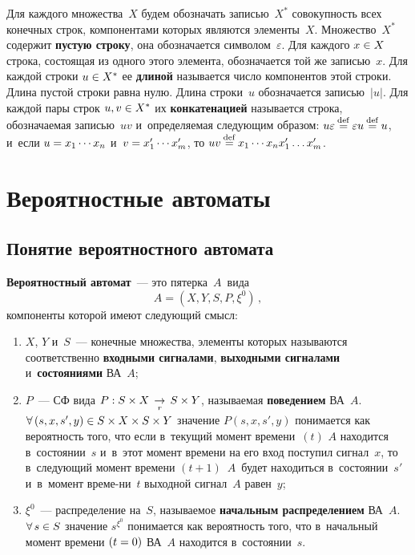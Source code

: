 \begin{multicols}{2}
Для каждого множества~$X$  будем обозначать записью~$X^*$
совокупность всех конечных строк, компонентами
которых являются элементы~$X$. Множество~$X^*$ содержит \textbf{пустую строку}, она обозначается
символом~$\varepsilon$.
Для каждого $x\hm\in X$ строка, состоящая из одного
этого элемента, обозначается той же записью~$x$.
Для каждой строки $u\hm\in X^*$
ее \textbf{длиной} называется чис\-ло компонентов этой строки. Длина пустой строки равна нулю.
Длина строки~$u$ обозначается записью~$|u|$.
Для каждой пары строк $u,v\hm\in X^*$
их \textbf{конкатенацией} называется строка, обозначаемая записью~$uv$
и~определяемая следующим образом:
$u \varepsilon\mathbin{{\mathop{=}\limits^{\mathrm{def}}}} \varepsilon u\mathbin{{\mathop{=}\limits^{\mathrm{def}}}} u$,
и~если $u\hm=x_1\cdots x_n$ и~$v\hm=x'_1\cdots x'_m$,
то $u v\mathbin{{\mathop{=}\limits^{\mathrm{def}}}} x_1\cdots x_nx'_1\ldots x'_m$.


\section{Вероятностные автоматы}

\subsection{Понятие вероятностного автомата}

\textbf{Вероятностный автомат}~--- это пятерка~$A$~вида
\begin{equation}
\label{dfsgdsfgdsffd44555}
A=\left(X,Y,S,P, \xi^0\right)\,,
\end{equation}
компоненты которой имеют следующий смысл:
\begin{enumerate}[(1)]
\item $X$, $Y$ и~$S$~--- конечные множества, элементы
которых называются соответственно
\textbf{входными сигналами},
\textbf{выходными сигналами} и~\textbf{состояниями} ВА~$A$;
\item $P$~--- СФ вида $P:S\times X\;\mathop{\to}\limits_{r}\; S\times Y$, называемая \textbf{поведением}
ВА~$A$. $\forall\,(s,x,s',y) \hm\in S\times X\times S\times Y$
значение $P(s,x,s',y)$ понимается как
   вероятность того, что
   если  в~текущий момент времени~$(t)$ $A$ находится
   в~состоянии~$s$ и~в~этот момент времени на его вход
   поступил сигнал~$x$,
то  в~следующий момент времени $(t+1)$~$A$~будет находиться
   в~состоянии~$s'$ и~в~момент време-\linebreak ни~$t$
   выходной сигнал~$A$ равен~$y$;
\item $\xi^0$~--- распределение на~$S$,
называемое  \textbf{начальным распределением} ВА~$A$.
$\forall\,s\hm\in S$ значение $s^{\xi^0}$ понимается как
вероятность того, что в~начальный момент времени $(t\hm=0)$
ВА~$A$ находится в~состоянии~$s$.
\end{enumerate}


\end{multicols}
